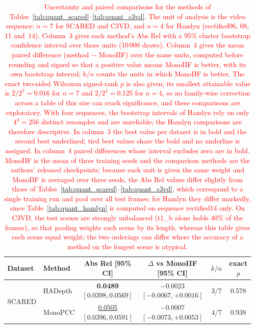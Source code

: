 \documentclass[a4paper,fleqn]{cas-dc}
\newcommand{\rev}{\color{red}}   %
\begin{document}
{%

\begin{table}[t]
\centering
\rev
\caption{\textcolor{red}{Uncertainty and paired comparisons for the methods of Tables~\ref{tab:quant_scared}--\ref{tab:quant_c3vd}. The unit of analysis is the video sequence: $n=7$ for SCARED and C3VD, and $n=4$ for Hamlyn (rectified06, 08, 11 and~14). Column~3 gives each method's Abs Rel with a 95\% cluster bootstrap confidence interval over those units (10\,000 draws). Column~4 gives the mean paired difference (method $-$ MonoIIF) over the same units, computed before rounding and signed so that a positive value means MonoIIF is better, with its own bootstrap interval; $k/n$ counts the units in which MonoIIF is better. The exact two-sided Wilcoxon signed-rank $p$ is also given; its smallest attainable value is $2/2^{7}=0.016$ for $n=7$ and $2/2^{4}=0.125$ for $n=4$, so no family-wise correction across a table of this size can reach significance, and these comparisons are exploratory. With four sequences, the bootstrap intervals of Hamlyn rely on only $4^4=256$ distinct resamples and are unreliable; the Hamlyn comparisons are therefore descriptive. In column~3 the best value per dataset is in bold and the second best underlined; tied best values share the bold and no underline is assigned. In column~4 paired differences whose interval excludes zero are in bold. MonoIIF is the mean of three training seeds and the comparison methods are the authors' released checkpoints; because each unit is given the same weight and MonoIIF is averaged over three seeds, the Abs Rel values differ slightly from those of Tables~\ref{tab:quant_scared}--\ref{tab:quant_c3vd}, which correspond to a single training run and pool over all test frames; for Hamlyn they differ markedly, since Table~\ref{tab:quant_hamlyn} is computed on sequence rectified14 only. On C3VD, the test scenes are strongly unbalanced (t1\_b alone holds 40\% of the frames), so that pooling weights each scene by its length, whereas this table gives each scene equal weight; the two orderings can differ where the accuracy of a method on the longest scene is atypical.}}
\label{tab:paired-c1}
\small
\begin{tabular}{llcccc}
\toprule
Dataset & Method & Abs Rel [95\% CI] & $\Delta$ vs MonoIIF [95\% CI] & $k/n$ & exact $p$ \\
\midrule
\multirow{6}{*}{SCARED}
 & HADepth            & \textbf{0.0489} $[0.0398, 0.0569]$    & $-0.0023$ $[-0.0067, +0.0016]$          & 3/7   & 0.578 \\
 & MonoPCC            & \underline{0.0505} $[0.0396, 0.0591]$ & $-0.0007$ $[-0.0073, +0.0053]$          & 4/7   & 0.938 \\

\end{tabular}
\end{table}}
\end{document}
